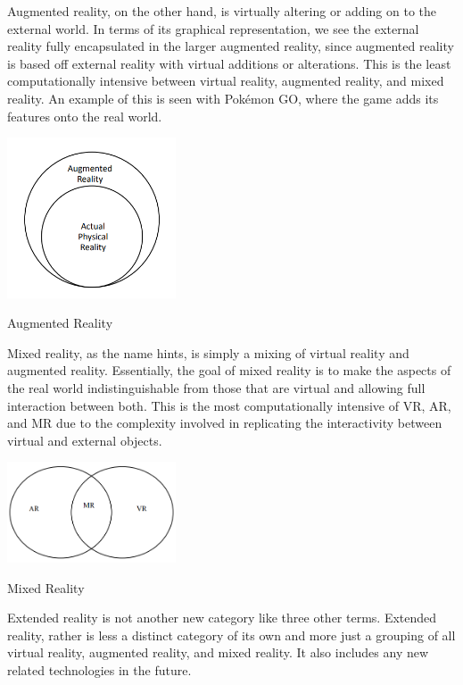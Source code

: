\documentclass[12pt]{article}
\begin{document}
Augmented reality, on the other hand, is virtually altering or adding on to the external world. In terms of its graphical representation, we see the external reality fully encapsulated in the larger augmented reality, since augmented reality is based off external reality with virtual additions or alterations. This is the least computationally intensive between virtual reality, augmented reality, and mixed reality. An example of this is seen with Pokémon GO, where the game adds its features onto the real world.

\begin{center}
\includegraphics[width = 5cm]{Image B.png}

Augmented Reality
\cite{vermaAdvancesAugmentedReality2022a}
\end{center}

Mixed reality, as the name hints, is simply a mixing of virtual reality and augmented reality. Essentially, the goal of mixed reality is to make the aspects of the real world indistinguishable from those that are virtual and allowing full interaction between both. This is the most computationally intensive of VR, AR, and MR due to the complexity involved in replicating the interactivity between virtual and external objects.
\cite{vermaAdvancesAugmentedReality2022a}

\begin{center}
\includegraphics[width = 5cm]{Image C.png}

Mixed Reality
\cite{vermaAdvancesAugmentedReality2022a}
\end{center}

Extended reality is not another new category like three other terms. Extended reality, rather is less a distinct category of its own and more just a grouping of all virtual reality, augmented reality, and mixed reality. It also includes any new related technologies in the future. \cite{vermaAdvancesAugmentedReality2022a}
\end{document}
